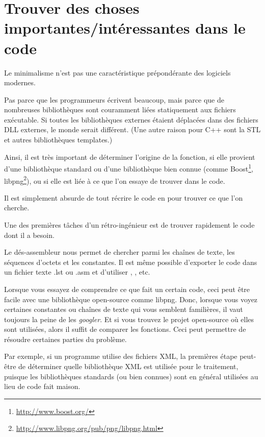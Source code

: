 \chapter{Trouver des choses importantes/intéressantes dans le code}

Le minimalisme n'est pas une caractéristique prépondérante des logiciels modernes.


Pas parce que les programmeurs écrivent beaucoup, mais parce que de nombreuses bibliothèques
sont couramment liées statiquement aux fichiers exécutable.
Si toutes les bibliothèques externes étaient déplacées dans des fichiers DLL externes,
le monde serait différent. (Une autre raison pour C++ sont la \ac{STL} et autres
bibliothèques templates.)

\newcommand{\FOOTNOTEBOOST}{\footnote{\url{http://www.boost.org/}}}
\newcommand{\FOOTNOTELIBPNG}{\footnote{\url{http://www.libpng.org/pub/png/libpng.html}}}

Ainsi, il est très important de déterminer l'origine de la fonction, si elle provient
d'une bibliothèque standard ou d'une bibliothèque bien connue (comme Boost\FOOTNOTEBOOST,
libpng\FOOTNOTELIBPNG), ou si elle est liée à ce que l'on essaye de trouver dans
le code.

Il est simplement absurde de tout récrire le code en \CCpp pour trouver ce que l'on
cherche.

Une des premières tâches d'un rétro-ingénieur est de trouver rapidement le code dont
il a besoin.

\myindex{\GrepUsage}

Le dés-assembleur \IDA nous permet de chercher parmi les chaînes de texte, les séquences
d'octets et les constantes.
Il est même possible d'exporter le code dans un fichier texte .lst ou .asm et d'utiliser
, , etc.

Lorsque vous essayez de comprendre ce que fait un certain code, ceci peut être facile
avec une bibliothèque open-source comme libpng.
Donc, lorsque vous voyez certaines constantes ou chaînes de texte qui vous semblent
familières, il vaut toujours la peine de les \emph{googler}.
Et si vous trouvez le projet open-source où elles sont utilisées, alors il suffit
de comparer les fonctions.
Ceci peut permettre de résoudre certaines parties du problème.

Par exemple, si un programme utilise des fichiers XML, la premières étape peut-être
de déterminer quelle bibliothèque XML est utilisée pour le traitement, puisque les
bibliothèques standards (ou bien connues) sont en général utilisées au lieu de code
fait maison.

